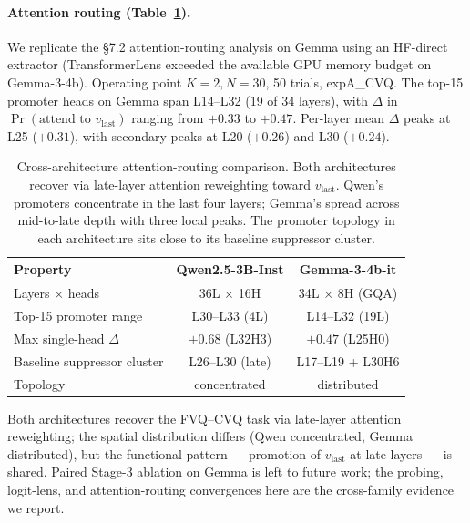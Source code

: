 \documentclass[letterpaper]{article} %
\begin{document}
\paragraph{Attention routing (Table~\ref{tab:gemma_routing}).}
We replicate the \S7.2 attention-routing
analysis on Gemma using an HF-direct extractor (TransformerLens
exceeded the available GPU memory budget on Gemma-3-4b). Operating
point $K{=}2, N{=}30$, 50 trials, expA\_CVQ. The top-15 promoter
heads on Gemma span L14--L32 (19 of 34 layers), with $\Delta$ in
$\Pr(\text{attend to }v_{\mathrm{last}})$ ranging from $+0.33$ to
$+0.47$. Per-layer mean $\Delta$ peaks at L25 ($+0.31$), with
secondary peaks at L20 ($+0.26$) and L30 ($+0.24$).

\begin{table}[!htbp]
\centering
\footnotesize
\setlength{\tabcolsep}{6pt}
\begin{tabular}{lcc}
\toprule
\textbf{Property} & \textbf{Qwen2.5-3B-Inst} & \textbf{Gemma-3-4b-it} \\
\midrule
Layers $\times$ heads        & 36L $\times$ 16H & 34L $\times$ 8H (GQA) \\
Top-15 promoter range        & L30--L33 (4L)    & L14--L32 (19L) \\
Max single-head $\Delta$     & $+0.68$ (L32H3)  & $+0.47$ (L25H0) \\
Baseline suppressor cluster  & L26--L30 (late)  & L17--L19 + L30H6 \\
Topology                     & concentrated     & distributed \\
\bottomrule
\end{tabular}
\caption{Cross-architecture attention-routing comparison. Both
architectures recover via late-layer attention reweighting toward
$v_{\mathrm{last}}$. Qwen's promoters concentrate in the last four
layers; Gemma's spread across mid-to-late depth with three local
peaks. The promoter topology in each architecture sits close to
its baseline suppressor cluster.}
\label{tab:gemma_routing}
\end{table}

Both architectures recover the FVQ--CVQ task via late-layer
attention reweighting; the spatial distribution differs (Qwen
concentrated, Gemma distributed), but the functional pattern
--- promotion of $v_{\mathrm{last}}$ at late layers --- is shared.
Paired Stage-3 ablation on Gemma is left to future work; the
probing, logit-lens, and attention-routing convergences here are
the cross-family evidence we report.

\end{document}

